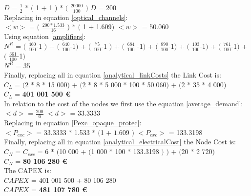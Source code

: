 $D$ = $\frac{1}{2}$ * $($ 1 + 1 $)$ * $($ $\frac{20000}{100}$ $)$ \qquad \qquad $D$ = 200\\

Replacing in equation \ref{optical_channels}:\\

$<w>$ = $($ $\frac{200 * 1.533}{16}$ $)$ * $($ 1 + 1.609$)$ \qquad \qquad $<w>$ = 50.060\\

Using equation \ref{amplifiers}:\\

$N^R$ = $($ $\frac{460}{100}$-1 $)$ + $($ $\frac{640}{100}$-1$)$ + $($ $\frac{75}{100}$-1 $)$ + $($ $\frac{684}{100}$ -1$)$ + $($ $\frac{890}{100}$-1$)$ + $($ $\frac{103}{100}$-1$)$ + $($ $\frac{761}{100}$-1$)$ + $($ $\frac{361}{100}$-1$)$\\

$N^R$ = 35\\

Finally, replacing all in equation \ref{analytical_linkCosts} the Link Cost is:\\

$C_L$ = $($2 * 8 * 15 000$)$ + $($2 * 8 * 5 000 * 100 * 50.060$)$ + $($2 * 35 * 4 000$)$\\

$C_L$ = \textbf{401 001 500 \euro}\\

In relation to the cost of the nodes we first use the equation \ref{average_demand}:\\

$<d>$ = $\frac{200}{6}$ \qquad \qquad $<d>$ = 33.3333\\

Replacing in equation \ref{Pexc_opaque_protec}:\\

$<P_{exc}>$ = 33.3333 * 1.533 * $($1 + $1.609$ $)$ \qquad \qquad $<P_{exc}>$ = 133.3198 \\

Finally, replacing all in equation \ref{analytical_electricalCost} the Node Cost is:\\

$C_N$ = $C_{exc}$ = 6 * $($10 000 + $($1 000 * 100 * 133.3198 $)$ $)$ + $($20 * 2 720$)$\\

$C_N$ = \textbf{80 106 280 \euro}\\

The CAPEX is:\\
$CAPEX$ = 401 001 500 + 80 106 280\\

$CAPEX$ = \textbf{481 107 780 \euro}\\


